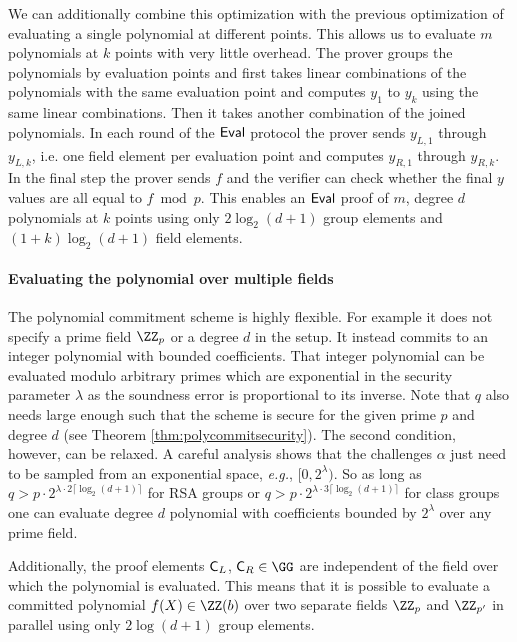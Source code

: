 We can additionally combine this optimization with the previous optimization of evaluating a single polynomial at different points. This allows us to evaluate $m$ polynomials at $k$ points with very little overhead. 
The prover groups the polynomials by evaluation points and first takes linear combinations of the polynomials with the same evaluation point and computes $y_1$ to $y_k$ using the same linear combinations. Then it takes another combination of the joined polynomials. In each round of the $\textsf{{Eval}}$ protocol the prover sends $y_{L,1}$ through $y_{L,k}$, i.e. one field element per evaluation point and computes $y_{R,1}$ through $y_{R,k}$. In the final step the prover sends $f$ and the verifier can check whether the final $y$ values are all equal to $f\bmod p$.
 This enables an $\textsf{{Eval}}$ proof of $m$, degree $d$ polynomials at $k$ points using only $2\log_2(d+1)$ group elements and $(1+k)\log_2(d+1)$ field elements.
 
\paragraph{Evaluating the polynomial over multiple fields}
The polynomial commitment scheme is highly flexible. For example it does not specify a prime field $\ZZ_p$ or a degree $d$ in the setup. It instead commits to an integer polynomial with bounded coefficients. That integer polynomial can be evaluated modulo arbitrary primes which are exponential in the security parameter $\lambda$ as the soundness error is proportional to its inverse.
Note that $q$ also needs large enough such that the scheme is secure for the given prime $p$ and degree $d$ (see Theorem \ref{thm:polycommitsecurity}). The second condition, however, can be relaxed. A careful analysis shows that the challenges $\alpha$ just need to be sampled from an exponential space, \emph{e.g.}, $[0,2^{\lambda})$. So as long as $q>p \cdot 2^{\lambda\cdot 2\lceil \log_2(d+1)\rceil}$ for RSA groups or  $q>p \cdot 2^{\lambda \cdot 3\lceil \log_2(d+1)\rceil}$ for class groups one can evaluate degree $d$ polynomial with coefficients bounded by $2^\lambda$ over any prime field.

Additionally, the proof elements $\gr{C}_L$, $\gr{C}_R \in \GG$ are independent of the field over which the polynomial is evaluated. This means that it is possible to evaluate a committed polynomial $f(X) \in \ZZ(b)$ over two separate fields $\ZZ_{p}$ and $\ZZ_{p'}$ in parallel using only $2\log(d+1)$ group elements. 



